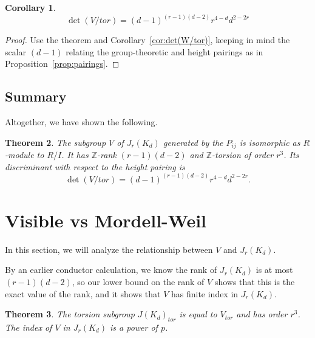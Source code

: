 \documentclass[reqno]{amsart}
\newtheorem{thm}{Theorem}[section]
\newtheorem{cor}[thm]{Corollary}
\theoremstyle{definition}
\theoremstyle{remark}
\def\Z{\mathbb{Z}}
\begin{document}
\begin{cor}
$$\det(V/tor)=(d-1)^{(r-1)(d-2)}r^{4-d}d^{2-2r}$$
\end{cor}

\begin{proof}
  Use the theorem and Corollary~\ref{cor:det(W/tor)}, keeping in mind
  the scalar $(d-1)$ relating the group-theoretic and height pairings
  as in Proposition~\ref{prop:pairings}.
\end{proof}

\subsection{Summary}
Altogether, we have shown the following.
\begin{thm}
  The subgroup $V$ of $J_r(K_d)$ generated by the $P_{ij}$ is
  isomorphic as $R$-module to $R/I$.  It has $\Z$-rank $(r-1)(d-2)$ and
  $\Z$-torsion of order $r^3$.  Its discriminant with respect to the height
  pairing is
$$\det(V/tor)=(d-1)^{(r-1)(d-2)}r^{4-d}d^{2-2r}.$$
\end{thm}


\section{Visible vs Mordell-Weil}
In this section, we will analyze the
relationship between $V$ and $J_r(K_d)$.

By an earlier conductor calculation, we know the rank of $J_r(K_d)$ is
at most $(r-1)(d-2)$, so our lower bound on the rank of $V$ shows
that this is the exact value of the rank, and it shows that $V$ has
finite index in $J_r(K_d)$.

\begin{thm}
  The torsion subgroup $J(K_d)_{tor}$ is equal to $V_{tor}$ and has
  order $r^3$.  The index of $V$ in $J_r(K_d)$ is a power of $p$.
\end{thm}
\end{document}
